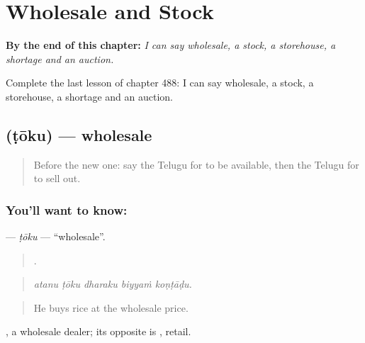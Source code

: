 
\chapter{Wholesale and Stock}
\label{ch:te-wholesale-and-stock}

\begin{chapteropening}
\textbf{By the end of this chapter:} \emph{I can say wholesale, a stock, a storehouse, a shortage and an auction.}

Complete the last lesson of chapter 488: I can say wholesale, a stock, a storehouse, a shortage and an auction.
\end{chapteropening}

\section[\texorpdfstring{\te{టోకు} (ṭōku)}{టోకు (ṭōku)}]{ (ṭōku) — wholesale}

\label{lesson:TE-C488-toku}



\begin{quote}
Before the new one: say the Telugu for to be available, then the Telugu for to sell out.
\end{quote}

\subsection*{You'll want to know: }
\textbf{} — \emph{ṭōku} — \textquotedblleft{}wholesale\textquotedblright{}.

\begin{quote}
    .
\end{quote}

\begin{quote}
\emph{atanu ṭōku dharaku biyyaṁ koṇṭāḍu.}
\end{quote}

\begin{quote}
He buys rice at the wholesale price.
\end{quote}

 , a wholesale dealer; its opposite is , retail.

